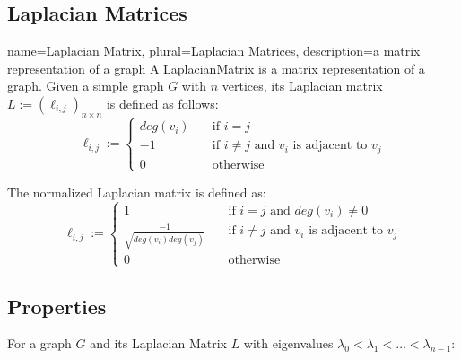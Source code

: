 \subsection{Laplacian Matrices}
{
    name={Laplacian Matrix},
    plural={Laplacian Matrices},
    description={a matrix representation of a graph}
}
A \gls{LaplacianMatrix} is a matrix representation of a graph. Given a simple 
graph $G$ with $n$ vertices, its Laplacian matrix $L := 
({\ell}_{i,j})_{n{\times}n}$ is defined as follows:
\begin{displaymath}
{\ell}_{i,j} := 
    \left\{
        \begin{array}{ll}
            deg(v_{i}) &    \quad \text{if $i = j$} \\
            -1 &            \quad \text{if $i \neq j$ and $v_{i}$ is adjacent to $v_{j}$} \\
            0 &             \quad \text{otherwise}
        \end{array}
    \right.
\end{displaymath}

The normalized Laplacian matrix is defined as:
\begin{displaymath}
{\ell}_{i,j} := 
    \left\{
        \begin{array}{ll}
            1 &                                             \quad \text{if $i = j$ and $deg(v_{i}) \neq 0$} \\
            \frac{-1}{\sqrt{deg(v_{i})deg(v_{j})}} & \quad  \text{if $i \neq j$ and $v_{i}$ is adjacent to $v_{j}$} \\
            0 &                                             \quad \text{otherwise}
        \end{array}
    \right.
\end{displaymath}

\subsection{Properties}
For a graph $G$ and its Laplacian Matrix $L$ with eigenvalues $\lambda_{0} <
\lambda_{1} < \ldots < \lambda_{n-1}$:


